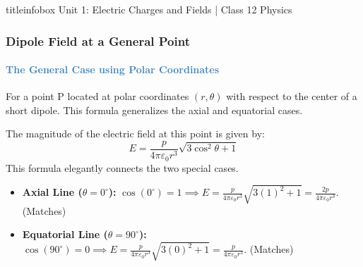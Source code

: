 \begin{frame}
\begin{frame}
\vfill

\begin{beamercolorbox}[wd=\textwidth,ht=0.5cm,dp=0.1cm,center]{titleinfobox}
    \small\color{coolgray} Unit 1: Electric Charges and Fields | Class 12 Physics
\end{beamercolorbox}
\end{frame}

\begin{frame}
\frametitle{\textsf{\textbf{Dipole Field at a General Point}}}
\framesubtitle{\textcolor{steelblue}{The General Case using Polar Coordinates}}

\begin{keybox}
\vspace{0.1cm}
For a point P located at polar coordinates $(r, \theta)$ with respect to the center of a short dipole. This formula generalizes the axial and equatorial cases.
\vspace{0.1cm}
\end{keybox}

\vspace{0.3cm}

\begin{formulabox}
\vspace{0.1cm}
The magnitude of the electric field at this point is given by:
\begin{equation*}
\boxed{E = \frac{p}{4\pi\varepsilon_0 r^3} \sqrt{3\cos^2\theta + 1}}
\end{equation*}
This formula elegantly connects the two special cases.
\vspace{0.1cm}
\end{formulabox}

\vspace{0.3cm}

\begin{examplebox}
\vspace{0.1cm}
\begin{itemize}
    \item \textbf{Axial Line ($\theta = 0^\circ$):} $\cos(0^\circ)=1 \implies E = \frac{p}{4\pi\varepsilon_0 r^3} \sqrt{3(1)^2+1} = \frac{2p}{4\pi\varepsilon_0 r^3}$. (Matches)
    \item \textbf{Equatorial Line ($\theta = 90^\circ$):} $\cos(90^\circ)=0 \implies E = \frac{p}{4\pi\varepsilon_0 r^3} \sqrt{3(0)^2+1} = \frac{p}{4\pi\varepsilon_0 r^3}$. (Matches)
\end{itemize}
\vspace{0.1cm}
\end{examplebox}


\end{frame}
\end{frame}
